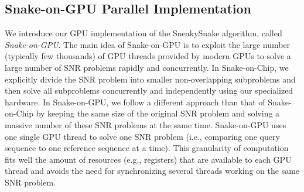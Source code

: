 \subsection{Snake-on-GPU Parallel Implementation} \label{Snake-on-GPU-Section}
{We} introduce our GPU implementation of the SneakySnake algorithm, called \emph{Snake-on-GPU}.
The main idea of Snake-on-GPU is to exploit the large number (typically few thousands) of GPU threads provided by modern GPUs to solve a large number of SNR problems rapidly and concurrently. 
In Snake-on-Chip, we explicitly divide the SNR problem into smaller non-overlapping subproblems and then solve all subproblems concurrently and independently using our specialized hardware. 
In Snake-on-GPU, we follow a different approach than that of Snake-on-Chip by keeping the same size of the original SNR problem and solving a massive number of these SNR problems at the same time. %
Snake-on-GPU uses one single GPU thread to solve one SNR problem (i.e., comparing one query sequence to one reference sequence at a time). 
This granularity of computation fits well the amount of resources (e.g., registers) that are available to each GPU thread and avoids the need for synchronizing several threads working on the same SNR problem. %

